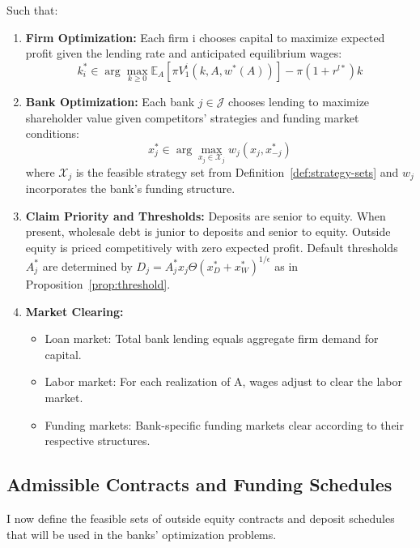\documentclass[12pt]{article}
\begin{document}
\begin{definition}
Such that:
\begin{enumerate}
    \item \textbf{Firm Optimization:} Each firm i chooses capital to maximize expected profit given the lending rate and anticipated equilibrium wages:
    \begin{equation}
        k_{i}^{*} \in \arg\max_{k \ge 0} \mathbb{E}_{A}[\pi V_{1}^{i}(k,A,w^{*}(A))] - \pi(1+r^{l*})k
    \end{equation}
    \item \textbf{Bank Optimization:} Each bank $j \in \mathcal{J}$ chooses lending to maximize shareholder value given competitors' strategies and funding market conditions:
    \begin{equation}
        x_{j}^{*} \in \arg\max_{x_{j} \in \mathcal{X}_j} w_{j}(x_{j},x_{-j}^{*})
    \end{equation}
    where $\mathcal{X}_j$ is the feasible strategy set from Definition~\ref{def:strategy-sets} and $w_{j}$ incorporates the bank's funding structure.
    \item \textbf{Claim Priority and Thresholds:} Deposits are senior to equity. When present, wholesale debt is junior to deposits and senior to equity. Outside equity is priced competitively with zero expected profit. Default thresholds $A_{j}^{*}$ are determined by $D_{j} = A_{j}^{*} x_{j} \Theta(x_{D}^{*}+x_{W}^{*})^{1/\epsilon}$ as in Proposition~\ref{prop:threshold}.
    \item \textbf{Market Clearing:}
    \begin{itemize}
        \item Loan market: Total bank lending equals aggregate firm demand for capital.
        \item Labor market: For each realization of A, wages adjust to clear the labor market.
        \item Funding markets: Bank-specific funding markets clear according to their respective structures.
    \end{itemize}
\end{enumerate}
\end{definition}


\subsection{Admissible Contracts and Funding Schedules}
\label{subsec:admissible}
I now define the feasible sets of outside equity contracts and deposit schedules that will be used in the banks' optimization problems.
\end{document}
